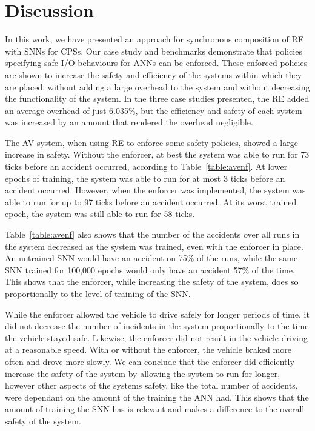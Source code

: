 \section{Discussion}
\label{sec:conclusion}

In this work, we have presented an approach for synchronous composition of \acf{RE} with \acfp{SNN} for \acp{CPS}.
Our case study and benchmarks demonstrate that policies specifying safe I/O behaviours for \acp{ANN} can be enforced.
These enforced policies are shown to increase the safety and efficiency of the systems within which they are placed, without adding a large overhead to the system and without decreasing the functionality of the system.
In the three case studies presented, the \ac{RE} added an average overhead of just 6.035\%, but the efficiency and safety of each system was increased by an amount that rendered the overhead negligible.

The \ac{AV} system, when using \ac{RE} to enforce some safety policies, showed a large increase in safety.
Without the enforcer, at best the system was able to run for 73 ticks before an accident occurred, according to Table~\ref{table:avenf}.
At lower epochs of training, the system was able to run for at most 3 ticks before an accident occurred.
However, when the enforcer was implemented, the system was able to run for up to 97 ticks before an accident occurred.
At its worst trained epoch, the system was still able to run for 58 ticks.

Table~\ref{table:avenf} also shows that the number of the accidents over all runs in the system decreased as the system was trained, even with the enforcer in place.
An untrained \ac{SNN} would have an accident on 75\% of the runs, while the same \ac{SNN} trained for 100,000 epochs would only have an accident 57\% of the time.
This shows that the enforcer, while increasing the safety of the system, does so proportionally to the level of training of the \ac{SNN}.

While the enforcer allowed the vehicle to drive safely for longer periods of time, it did not decrease the number of incidents in the system proportionally to the time the vehicle stayed safe.
Likewise, the enforcer did not result in the vehicle driving at a reasonable speed.
With or without the enforcer, the vehicle braked more often and drove more slowly.
We can conclude that the enforcer did efficiently increase the safety of the system by allowing the system to run for longer, however other aspects of the systems safety, like the total number of accidents, were dependant on the amount of the training the \ac{ANN} had.
This shows that the amount of training the \ac{SNN} has is relevant and makes a difference to the overall safety of the system.

